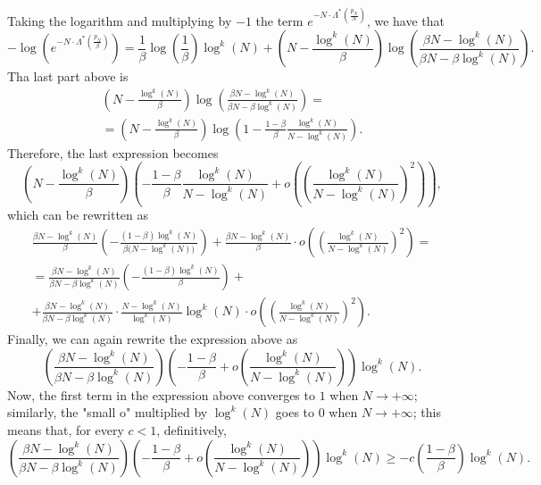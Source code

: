  \begin{remark}
Taking the logarithm and multiplying by $-1$ the term $e^{- N \cdot \Lambda^* \left( \frac{p_N}{N} \right) }$, we have that \begin{equation} \label{other:claim} - \log \left( e^{- N \cdot \Lambda^*\left(\frac{p_N}{\beta}\right)} \right) = \frac{1}{\beta} \log \left( \frac{1}{\beta} \right) \log^k(N) + \left( N - \frac{\log^k(N)}{\beta} \right) \log \left( \frac{\beta N  - \log^k(N)}{\beta N - \beta \log^k(N)} \right). \end{equation} Tha last part above is \begin{multline*} \left( N - \frac{\log^k(N)}{\beta} \right) \log \left( \frac{\beta N  - \log^k(N)}{\beta N - \beta \log^k(N)} \right) = \\ = \left( N - \frac{\log^k(N)}{\beta} \right) \log \left( 1 - \frac{1 - \beta}{\beta} \frac{\log^k(N)}{N - \log^k(N)} \right). \end{multline*}
Therefore, the last expression becomes \[ \left( N - \frac{\log^k(N)}{\beta} \right) \left( - \frac{1 - \beta}{\beta} \frac{\log^k(N)}{N - \log^k(N)} + o \left( \left( \frac{\log^{k}(N)}{N - \log^k(N)} \right)^2 \right) \right), \] which can be rewritten as \begin{multline*} \frac{ \beta N - \log^k(N)}{\beta} \left( - \frac{(1 - \beta) \log^k(N)}{\beta \big( N - \log^k(N) \big) } \right) + \frac{ \beta N - \log^k(N)}{\beta} \cdot o \left( \left( \frac{\log^{k}(N)}{N - \log^k(N)} \right)^2 \right) = \\ = \frac{ \beta N - \log^k(N) }{ \beta N - \beta \log^k(N) } \left( - \frac{(1 - \beta) \log^k(N)}{\beta} \right) + \\ + \frac{ \beta N - \log^k(N)}{ \beta N - \beta \log^k(N) } \cdot \frac{ N - \log^k(N) }{ \log^k(N) } \log^k(N) \cdot o \left( \left( \frac{\log^{k}(N)}{N - \log^k(N)} \right)^2 \right). \end{multline*}
Finally, we can again rewrite the expression above as \[ \left( \frac{ \beta N - \log^k(N) }{ \beta N - \beta \log^k(N) } \right) \left( - \frac{1 - \beta}{\beta} + o \left( \frac{\log^{k}(N)}{N - \log^k(N)} \right) \right) \log^k(N). \]
Now, the first term in the expression above converges to $1$ when $N \to +\infty$; similarly, the "small o" multiplied by $\log^k(N)$ goes to $0$ when $N \to +\infty$; this means that, for every $c < 1$, definitively, \[ \left( \frac{ \beta N - \log^k(N) }{ \beta N - \beta \log^k(N) } \right) \left( - \frac{1 - \beta}{\beta} + o \left( \frac{\log^{k}(N)}{N - \log^k(N)} \right) \right) \log^k(N) \geq -c \left( \frac{1-\beta}{\beta} \right) \log^k(N). \]
  

\end{remark}
